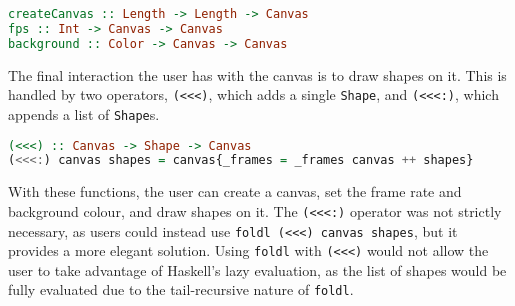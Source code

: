 \documentclass[../main.tex]{subfiles}
\begin{document}
        \begin{lstlisting}[language=Haskell, label={lst:fps}, morekeywords={Canvas, Length},
            caption={The createCanvas, fps and backgrounds function.}]
createCanvas :: Length -> Length -> Canvas
fps :: Int -> Canvas -> Canvas
background :: Color -> Canvas -> Canvas\end{lstlisting}

        The final interaction the user has with the canvas is to draw shapes on it.
        This is handled by two operators, \verb|(<<<)|, which adds a single
            \verb|Shape|, and \verb|(<<<:)|, which appends a list of \verb|Shape|s.

        \begin{lstlisting}[language=Haskell, label={lst:<<<}, morekeywords={Canvas, Shape},
            caption={The operators to append a frame to the canvas.}]
(<<<) :: Canvas -> Shape -> Canvas
(<<<:) canvas shapes = canvas{_frames = _frames canvas ++ shapes}\end{lstlisting}

        With these functions, the user can create a canvas, set the frame rate and
            background colour, and draw shapes on it.
        The \verb|(<<<:)| operator was not strictly necessary, as users could instead
            use \verb|foldl (<<<) canvas shapes|, but it provides a more elegant solution.
        Using \verb|foldl| with \verb|(<<<)| would not allow the user to take advantage
            of Haskell's lazy evaluation, as the list of shapes would be fully evaluated
            due to the tail-recursive nature of \verb|foldl|.
\end{document}
